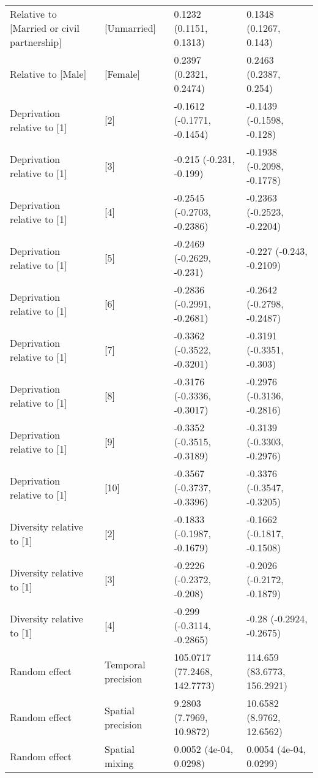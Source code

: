 \begin{table}[ht]
\begin{tabular}{llll}
  Relative to [Married or civil partnership] & [Unmarried] & 0.1232 (0.1151, 0.1313) & 0.1348 (0.1267, 0.143) \\ 
  Relative to [Male] & [Female] & 0.2397 (0.2321, 0.2474) & 0.2463 (0.2387, 0.254) \\ 
  Deprivation relative to [1] & [2] & -0.1612 (-0.1771, -0.1454) & -0.1439 (-0.1598, -0.128) \\ 
  Deprivation relative to [1] & [3] & -0.215 (-0.231, -0.199) & -0.1938 (-0.2098, -0.1778) \\ 
  Deprivation relative to [1] & [4] & -0.2545 (-0.2703, -0.2386) & -0.2363 (-0.2523, -0.2204) \\ 
  Deprivation relative to [1] & [5] & -0.2469 (-0.2629, -0.231) & -0.227 (-0.243, -0.2109) \\ 
  Deprivation relative to [1] & [6] & -0.2836 (-0.2991, -0.2681) & -0.2642 (-0.2798, -0.2487) \\ 
  Deprivation relative to [1] & [7] & -0.3362 (-0.3522, -0.3201) & -0.3191 (-0.3351, -0.303) \\ 
  Deprivation relative to [1] & [8] & -0.3176 (-0.3336, -0.3017) & -0.2976 (-0.3136, -0.2816) \\ 
  Deprivation relative to [1] & [9] & -0.3352 (-0.3515, -0.3189) & -0.3139 (-0.3303, -0.2976) \\ 
  Deprivation relative to [1] & [10] & -0.3567 (-0.3737, -0.3396) & -0.3376 (-0.3547, -0.3205) \\ 
  Diversity relative to [1] & [2] & -0.1833 (-0.1987, -0.1679) & -0.1662 (-0.1817, -0.1508) \\ 
  Diversity relative to [1] & [3] & -0.2226 (-0.2372, -0.208) & -0.2026 (-0.2172, -0.1879) \\ 
  Diversity relative to [1] & [4] & -0.299 (-0.3114, -0.2865) & -0.28 (-0.2924, -0.2675) \\ 
  Random effect & Temporal precision & 105.0717 (77.2468, 142.7773) & 114.659 (83.6773, 156.2921) \\ 
  Random effect & Spatial precision & 9.2803 (7.7969, 10.9872) & 10.6582 (8.9762, 12.6562) \\ 
  Random effect & Spatial mixing & 0.0052 (4e-04, 0.0298) & 0.0054 (4e-04, 0.0299) \\ 
   \hline
\end{tabular}
\end{table}
